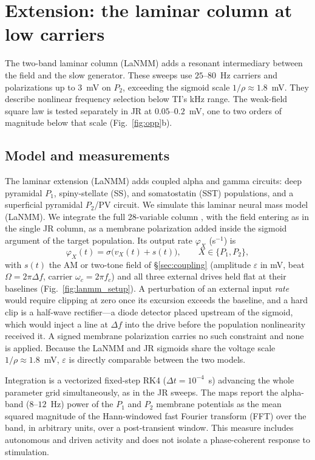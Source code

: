 \documentclass[11pt,a4paper]{article}
\newcommand{\Sig}{\sigma}
\begin{document}
\section{Extension: the laminar column at low carriers}\label{app:lanmm}
The two-band laminar column (LaNMM) adds a resonant intermediary
between the field and the slow generator. These sweeps use $25$--$80$~Hz carriers
and polarizations up to $3$~mV on $P_2$, exceeding the sigmoid scale
$1/\rho\approx1.8$~mV. They describe nonlinear frequency selection below TI's
kHz range. The weak-field square law is tested separately in JR at
$0.05$--$0.2$~mV, one to two orders of magnitude below that scale
(Fig.~\ref{fig:opp}b).

\subsection{Model and measurements}\label{sec:lanmm-methods}
The laminar extension (LaNMM)
\cite{ruffini2025cfc,sanchezTodo2023} adds coupled alpha and gamma circuits: deep
pyramidal $P_1$, spiny-stellate (SS), and somatostatin (SST) populations, and a
superficial pyramidal $P_2$/PV circuit.
We simulate this laminar neural mass model (LaNMM). We integrate the full 28-variable column
\cite{ruffini2025cfc,sanchezTodo2023}, with the field entering as in the single
JR column, as a membrane polarization added inside the sigmoid argument of the target
population. Its output rate $\varphi_X$ (s$^{-1}$) is
\begin{equation}
\varphi_X(t)=\Sig\!\big(v_X(t)+s(t)\big),\qquad X\in\{P_1,P_2\},
\label{eq:lanmm_drive}
\end{equation}
with $s(t)$ the AM or two-tone field of \S\ref{sec:coupling} (amplitude $\varepsilon$ in
mV, beat $\Omega=2\pi\Delta f$, carrier $\omega_c=2\pi f_c$) and all three external drives
held flat at their baselines (Fig.~\ref{fig:lanmm_setup}). A perturbation of an external
input \emph{rate} would require clipping at zero
once its excursion exceeds the baseline, and a hard clip is a half-wave rectifier---a
diode detector placed upstream of the sigmoid, which would inject a line at $\Delta f$
into the drive before the population nonlinearity received it. A signed membrane
polarization carries no such constraint and none is applied. Because the LaNMM and JR
sigmoids share the voltage scale $1/\rho\approx1.8$~mV, $\varepsilon$ is directly
comparable between the two models.

Integration is a vectorized fixed-step RK4
($\Delta t=10^{-4}$~s) advancing the whole parameter grid simultaneously, as in the JR
sweeps. The maps report the
alpha-band ($8$--$12$~Hz) power of the $P_1$ and $P_2$ membrane potentials as the mean
squared magnitude of the Hann-windowed fast Fourier transform (FFT) over the band, in arbitrary units, over a
post-transient window. This measure includes autonomous and driven activity and
does not isolate a phase-coherent response to stimulation.
\end{document}
